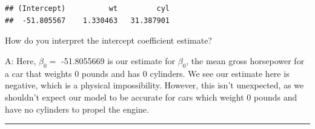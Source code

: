 \documentclass[]{book}
\begin{document}
\begin{verbatim}
## (Intercept)          wt         cyl 
##  -51.805567    1.330463   31.387901
\end{verbatim}

How do you interpret the intercept coefficient estimate?

A: Here, \(\hat\beta_{0} =\) -51.8055669 is our estimate for
\(\beta_{0}\), the mean gross horsepower for a car that weights 0 pounds
and has 0 cylinders. We see our estimate here is negative, which is a
physical impossibility. However, this isn't unexpected, as we shouldn't
expect our model to be accurate for cars which weight 0 pounds and have
no cylinders to propel the engine.

\begin{center}\rule{0.5\linewidth}{\linethickness}\end{center}
\end{document}
